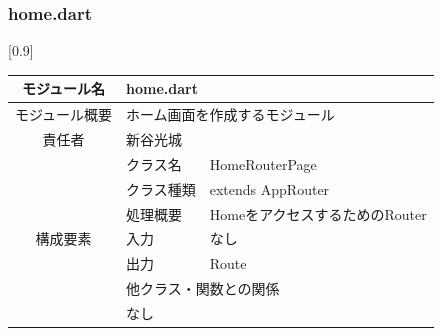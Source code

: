 \subsubsection{home.dart}
\begin{table}[H]
  \centering
  \scalebox{0.8}[0.9]{
    \begin{tabular}{|c|l|l|} \hline
モジュール名 & \multicolumn{2}{l|}{home.dart}                                                                                                                   \\ \hline
      モジュール概要               & \multicolumn{2}{p{12cm}|}{ホーム画面を作成するモジュール}                                                                                                       \\ \hline
      責任者                   & \multicolumn{2}{l|}{新谷光城}                                                                                                                        \\ \hline
      \multirow{7}{*}{構成要素} & クラス名                                                                                & HomeRouterPage                                             \\ \cline{2-3}
                            & クラス種類                                                                               & extends AppRouter                                          \\ \cline{2-3}
                            & 処理概要                                                                                & \multicolumn{1}{p{12cm}|}{HomeをアクセスするためのRouter}            \\ \cline{2-3}
                            & 入力                                                                                  & なし                                                         \\ \cline{2-3}
                            & 出力                                                                                  & Route                                                      \\ \cline{2-3}
                            & \multicolumn{2}{l|}{他クラス・関数との関係}                                                                                                                 \\ \cline{2-3}
                            & \multicolumn{2}{p{14cm}|}{なし}                                                                                                                    \\ \hline

\end{tabular}}
\end{table}
